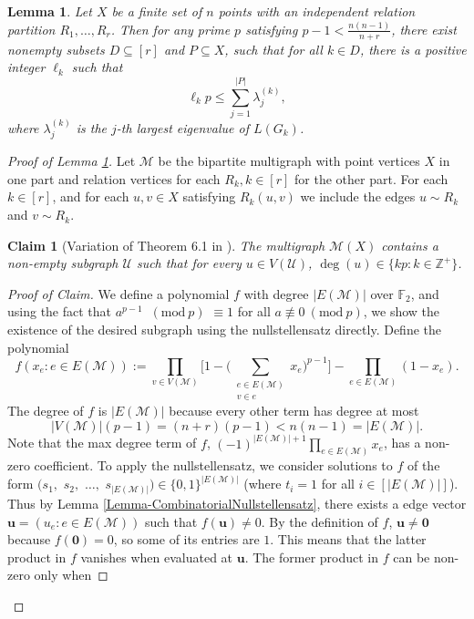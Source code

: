 \documentclass[12pt]{article}
\newcommand{\Z}{\mathbb{Z}}
\newcommand{\Mod}[1]{\ (\mathrm{mod}\ #1)}
\newtheorem{lem}{Lemma} %
\newtheorem*{claim}{Claim}
\theoremstyle{definition}
\begin{document}
	\begin{lem}\label{Lem-NullstellensatzEigenvalueInterlacing}
		Let $X$ be a finite set of $n$ points with an independent relation partition $R_1, \ldots, R_r$.  Then for any prime $p$ satisfying $p-1 < \tfrac{n(n-1)}{n+r}$, there exist nonempty subsets $D \subseteq [r]$ and $P \subseteq X$, such that for all $k \in D$, there is a positive integer $\ell_k$ such that
		$$\ell_k p \leq \sum_{j =1}^{|P|}\lambda_j^{(k)},$$
		where $\lambda_j^{(k)}$ is the $j$-th largest eigenvalue of $L(G_k)$.
	\end{lem}
	\begin{proof}[Proof of Lemma \ref{Lem-NullstellensatzEigenvalueInterlacing}]
		Let $\mathcal{M}$ be the bipartite multigraph with point vertices $X$ in one part and relation vertices for each $R_k, k\in [r]$ for the other part.  For each $k \in [r]$, and for each $u,v \in X$ satisfying $R_k(u,v)$ we include the edges $u\sim R_k$ and $v \sim R_k$.
		\begin{claim}[Variation of Theorem 6.1 in \cite{alon}]\label{Prop-SubgraphNullstellensatzResult}
				The multigraph $\mathcal{M}(X)$ contains a non-empty subgraph $\mathcal{U}$ such that for every $u \in V(\mathcal{U})$, $\deg(u) \in \{kp: k \in \Z^+\}$.  %
		\end{claim}
			\begin{proof}[Proof of Claim]
				We define a polynomial $f$ with degree $|E(\mathcal{M})|$ over $\mathbb{F}_2$, and using the fact that $a^{p-1}$ $\Mod{p}$ $\equiv 1$ for all $a \not\equiv 0 \Mod{p}$, we show the existence of the desired subgraph using the nullstellensatz directly.
				Define the polynomial
				$$f(x_e:e \in E(\mathcal{M})) := \prod_{v \in V(\mathcal{M})} \biggr[1 - \Big(\sum_{\substack{e \in E(\mathcal{M})\\ v \in e}}x_e \Big)^{p-1} \biggr] - \prod_{e \in E(\mathcal{M})}(1-x_e).$$
				The degree of $f$ is $|E(\mathcal{M})|$ because every other term has degree at most
				$$|V(\mathcal{M})| (p-1) = (n+r)(p-1) < n(n-1) = |E(\mathcal{M})|.$$
				Note that the max degree term of $f$, $(-1)^{|E(\mathcal{M})|+1}\prod_{e \in E(\mathcal{M})} x_e$, has a non-zero coefficient. 
				To apply the nullstellensatz, we consider solutions to $f$ of the form $(s_1,$ $s_2,$ $\ldots,$ $s_{|E(\mathcal{M})|}) \in \{0,1\}^{|E(\mathcal{M})|}$ (where $t_i = 1$ for all $i \in [|E(\mathcal{M})|]$).  Thus by Lemma \ref{Lemma-CombinatorialNullstellensatz}, there exists a edge vector $\mathbf{u}=(u_e:e \in E(\mathcal{M}))$ such that $f(\mathbf{u}) \neq 0$.  By the definition of $f$, $\mathbf{u} \neq \mathbf{0}$ because $f(\mathbf{0}) = 0$, so some of its entries are $1$.  This means that the latter product in $f$ vanishes when evaluated at $\mathbf{u}$.  The former product in $f$ can be non-zero only when

\end{proof}
\end{proof}
\end{document}
